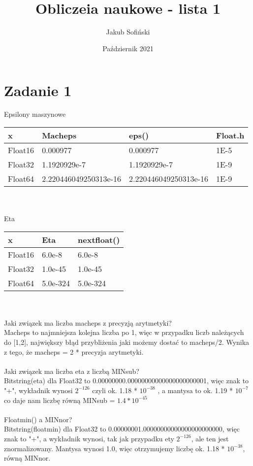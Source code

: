 \documentclass{article}
\title{Obliczeia naukowe - lista 1}
\author{Jakub Sofiński}
\date{Październik 2021}
\begin{document}
\maketitle

\section*{Zadanie 1}
Epsilony maszynowe\\
\begin{tabular}{|l|l|l|l|} \hline
x       & Macheps & eps() & Float.h  \\ \hline
Float16 & 0.000977              & 0.000977              & 1E-5     \\ \hline
Float32 & 1.1920929e-7          & 1.1920929e-7          & 1E-9     \\ \hline
Float64 & 2.220446049250313e-16 & 2.220446049250313e-16 & 1E-9     \\ \hline
\end{tabular} \\
\\
Eta\\
\begin{tabular}{|l|l|l|} \hline
x       & Eta       & nextfloat()   \\ \hline
Float16 & 6.0e-8       & 6.0e-8     \\ \hline
Float32 & 1.0e-45      & 1.0e-45    \\ \hline
Float64 & 5.0e-324     & 5.0e-324   \\ \hline
\end{tabular}\\
\\
Jaki związek ma liczba macheps z precyzją arytmetyki?\\
Macheps to najmniejsza kolejna liczba po 1, więc w przypadku liczb należących do [1,2], największy błąd przybliżenia jaki możemy dostać to macheps/2. Wynika z tego, że macheps =  2 * precyzja arytmetyki. \\
\\
Jaki związek ma liczba eta z liczbą MINsub?\\
Bitstring(eta) dla Float32 to 0.00000000.00000000000000000000001, więc znak to "+", wykładnik wynosi ${2^{-126}}$ czyli ok. 1.18 * ${10^{-38}}$ , a mantysa to ok. 1.19 * ${10^{-7}}$ co daje nam liczbę równą MINsub = ${1.4 * 10^{-45}}$ \\
\\
Floatmin() a MINnor?\\
Bitstring(floatmin) dla Float32 to 0.00000001.00000000000000000000000, więc znak to "+", a wykładnik wynosi, tak jak przypadku ety ${2^{-126}}$, ale ten jest znormalizowany. Mantysa wynosi 1.0, więc otrzymujemy liczbę ok. 1.18 * ${10^{-38}}$, równą MINnor. \\
\end{document}
